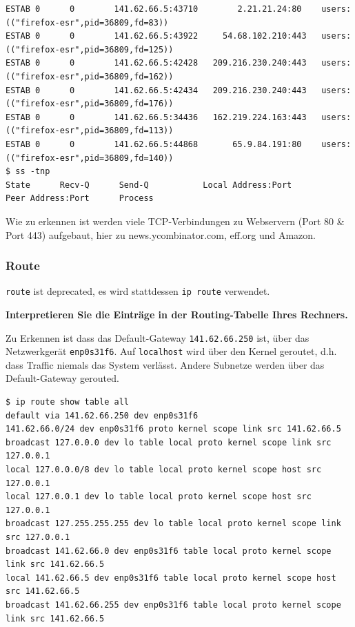 \begin{verbatim}
ESTAB 0      0        141.62.66.5:43710        2.21.21.24:80    users:(("firefox-esr",pid=36809,fd=83))
ESTAB 0      0        141.62.66.5:43922     54.68.102.210:443   users:(("firefox-esr",pid=36809,fd=125))
ESTAB 0      0        141.62.66.5:42428   209.216.230.240:443   users:(("firefox-esr",pid=36809,fd=162))
ESTAB 0      0        141.62.66.5:42434   209.216.230.240:443   users:(("firefox-esr",pid=36809,fd=176))
ESTAB 0      0        141.62.66.5:34436   162.219.224.163:443   users:(("firefox-esr",pid=36809,fd=113))
ESTAB 0      0        141.62.66.5:44868       65.9.84.191:80    users:(("firefox-esr",pid=36809,fd=140))
$ ss -tnp
State      Recv-Q      Send-Q           Local Address:Port           Peer Address:Port      Process
\end{verbatim}

Wie zu erkennen ist werden viele TCP-Verbindungen zu Webservern (Port 80
\& Port 443) aufgebaut, hier zu news.ycombinator.com, eff.org und
Amazon.

\hypertarget{route}{%
\subsubsection{Route}\label{route}}

\texttt{route} ist deprecated, es wird stattdessen \texttt{ip\ route}
verwendet.

\textbf{Interpretieren Sie die Einträge in der Routing-Tabelle Ihres
Rechners.}

Zu Erkennen ist dass das Default-Gateway \texttt{141.62.66.250} ist,
über das Netzwerkgerät \texttt{enp0s31f6}. Auf \texttt{localhost} wird
über den Kernel geroutet, d.h. dass Traffic niemals das System verlässt.
Andere Subnetze werden über das Default-Gateway gerouted.

\begin{verbatim}
$ ip route show table all
default via 141.62.66.250 dev enp0s31f6
141.62.66.0/24 dev enp0s31f6 proto kernel scope link src 141.62.66.5
broadcast 127.0.0.0 dev lo table local proto kernel scope link src 127.0.0.1
local 127.0.0.0/8 dev lo table local proto kernel scope host src 127.0.0.1
local 127.0.0.1 dev lo table local proto kernel scope host src 127.0.0.1
broadcast 127.255.255.255 dev lo table local proto kernel scope link src 127.0.0.1
broadcast 141.62.66.0 dev enp0s31f6 table local proto kernel scope link src 141.62.66.5
local 141.62.66.5 dev enp0s31f6 table local proto kernel scope host src 141.62.66.5
broadcast 141.62.66.255 dev enp0s31f6 table local proto kernel scope link src 141.62.66.5
\end{verbatim}

